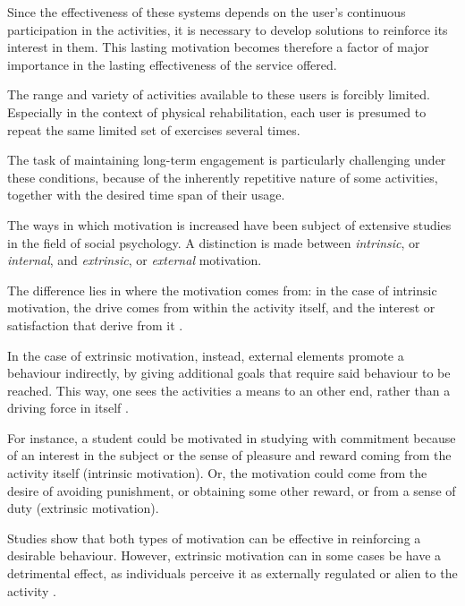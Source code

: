 \documentclass[12pt,a4paper,oneside]{report}
\begin{document}
Since the effectiveness of these systems depends on the user's continuous participation in the activities, it is necessary to develop solutions to reinforce its interest in them. This lasting motivation becomes therefore a factor of major importance in the lasting effectiveness of the service offered.

\bigskip

The range and variety of activities available to these users is forcibly limited. Especially in the context of physical rehabilitation, each user is presumed to repeat the same limited set of exercises several times.

The task of maintaining long-term engagement is particularly challenging under these conditions, because of the inherently repetitive nature of some activities, together with the desired time span of their usage.

The ways in which motivation is increased have been subject of extensive studies in the field of social psychology. A distinction is made between \textit{intrinsic}, or \textit{internal}, and \textit{extrinsic}, or \textit{external} motivation.

The difference lies in where the motivation comes from: in the case of intrinsic motivation, the drive comes from within the activity itself, and the interest or satisfaction that derive from it \cite{vallerand92}.

In the case of extrinsic motivation, instead, external elements promote a behaviour indirectly, by giving additional goals that require said behaviour to be reached. This way, one sees the activities a means to an other end, rather than a driving force in itself \cite{vallerand92}.

\bigskip

For instance, a student could be motivated in studying with commitment because of an interest in the subject or the sense of pleasure and reward coming from the activity itself (intrinsic motivation). Or, the motivation could come from the desire of avoiding punishment, or obtaining some other reward, or from a sense of duty (extrinsic motivation).

\bigskip

Studies show that both types of motivation can be effective in reinforcing a desirable behaviour. However, extrinsic motivation can in some cases be have a detrimental effect, as individuals perceive it as externally regulated or alien to the activity \cite{decharms68} \cite{ryan2000}.
\end{document}
